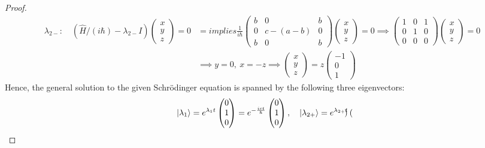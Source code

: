 \documentclass{article}
\begin{document}
\begin{proof}
    \begin{align}
        \lambda_{2-}: \quad (\hat{H}/(i\hbar)-\lambda_{2-} I)\begin{pmatrix}
            x\\y\\z
        \end{pmatrix} = 0&=implies \frac{1}{i\hbar}\begin{pmatrix}
            b&0&b\\0&c-(a-b)&0\\b&0&b
        \end{pmatrix}\begin{pmatrix}
            x\\y\\z
        \end{pmatrix}=0\implies \begin{pmatrix}
            1&0&1\\0&1&0\\0&0&0
        \end{pmatrix}\begin{pmatrix}
            x\\y\\z
        \end{pmatrix}=0\\
        &\implies y=0,\ x=-z \implies \begin{pmatrix}
            x\\y\\z
        \end{pmatrix} = z\begin{pmatrix}
            -1\\0\\1
        \end{pmatrix}
    \end{align}
    Hence, the general solution to the given Schr\"odinger equation is spanned by the following three eigenvectors:
    \begin{align}
        \ket{\lambda_1}=e^{\lambda_1 t}\begin{pmatrix}
            0\\1\\0
        \end{pmatrix} = e^{-\frac{ict}{\hbar}}\begin{pmatrix}
            0\\1\\0
        \end{pmatrix},\quad \ket{\lambda_{2+}}=e^{\lambda_{2+}t}\begin{pmatrix}

\end{pmatrix}
\end{align}
\end{proof}
\end{document}
